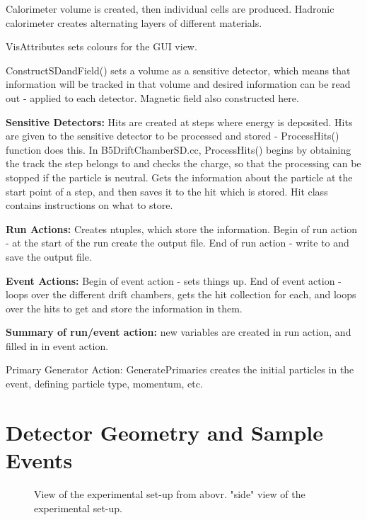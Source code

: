 \documentclass[a4paper,11pt,twoside]{article}
\begin{document}
Calorimeter volume is created, then individual cells are produced.
Hadronic calorimeter creates alternating layers of different materials.

VisAttributes sets colours for the GUI view.

ConstructSDandField() sets a volume as a sensitive detector, which means that information will be tracked in that volume and desired information can be read out - applied to each detector.
Magnetic field also constructed here.

{\bf Sensitive Detectors:}  Hits are created at steps where energy is deposited.
Hits are given to the sensitive detector to be processed and stored - ProcessHits() function does this.
In B5DriftChamberSD.cc, ProcessHits() begins by obtaining the track the step belongs to and checks the charge, so that the processing can be stopped if the particle is neutral. Gets the information about the particle at the start point of a step, and then saves it to the hit which is stored. Hit class contains instructions on what to store.

{\bf Run Actions:}
Creates ntuples, which store the information.
Begin of run action - at the start of the run create the output file.
End of run action - write to and save the output file.

{\bf Event Actions:}
Begin of event action - sets things up.
End of event action - loops over the different drift chambers, gets the hit collection for each, and loops over the hits to get and store the information in them.

{\bf Summary of run/event action:} new variables are created in run action, and filled in in event action.

Primary Generator Action:
GeneratePrimaries creates the initial particles in the event, defining particle type, momentum, etc.

\section{Detector Geometry and Sample Events}

\begin{figure}[h] 
  \centering
  \caption{ View of the experimental set-up from abovr.  "side" view of the experimental set-up.\label{fig:limits}}
\end{figure}
\end{document}
